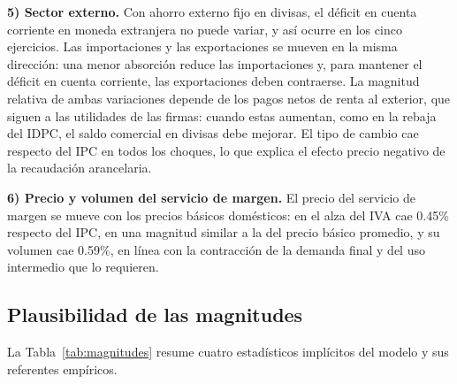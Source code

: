 \documentclass[11pt]{article}
\begin{document}
\textbf{5) Sector externo.} Con ahorro externo fijo en divisas, el déficit en cuenta corriente en moneda extranjera no puede variar, y así ocurre en los cinco ejercicios. Las importaciones y las exportaciones se mueven en la misma dirección: una menor absorción reduce las importaciones y, para mantener el déficit en cuenta corriente, las exportaciones deben contraerse. La magnitud relativa de ambas variaciones depende de los pagos netos de renta al exterior, que siguen a las utilidades de las firmas: cuando estas aumentan, como en la rebaja del IDPC, el saldo comercial en divisas debe mejorar. El tipo de cambio cae respecto del IPC en todos los choques, lo que explica el efecto precio negativo de la recaudación arancelaria.

\textbf{6) Precio y volumen del servicio de margen.} El precio del servicio de margen se mueve con los precios básicos domésticos: en el alza del IVA cae 0.45\% respecto del IPC, en una magnitud similar a la del precio básico promedio, y su volumen cae 0.59\%, en línea con la contracción de la demanda final y del uso intermedio que lo requieren.

\subsection{Plausibilidad de las magnitudes}

La Tabla~\ref{tab:magnitudes} resume cuatro estadísticos implícitos del modelo y sus referentes empíricos.

\begin{table}[H]
\centering
\caption{Magnitudes implícitas del modelo y referentes empíricos}
\label{tab:magnitudes}
\small
{}
\end{table}
\end{document}
